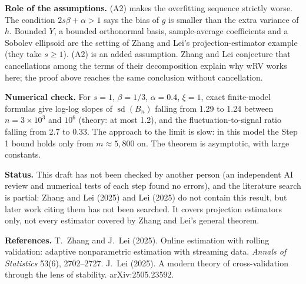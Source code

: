 \documentclass[11pt]{article}
\newcommand{\sd}{\operatorname{sd}}
\begin{document}
\textbf{Role of the assumptions.} (A2) makes the overfitting sequence strictly worse. The condition $2s\beta+\alpha>1$ says the bias of $g$ is smaller than the extra variance of $h$. Bounded $Y$, a bounded orthonormal basis, sample-average coefficients and a Sobolev ellipsoid are the setting of Zhang and Lei's projection-estimator example (they take $s\ge1$). (A2) is an added assumption. Zhang and Lei conjecture that cancellations among the terms of their decomposition explain why wRV works here; the proof above reaches the same conclusion without cancellation.

\textbf{Numerical check.} For $s=1$, $\beta=1/3$, $\alpha=0.4$, $\xi=1$, exact finite-model formulas give log-log slopes of $\sd(B_n)$ falling from 1.29 to 1.24 between $n=3\times10^3$ and $10^6$ (theory: at most 1.2), and the fluctuation-to-signal ratio falling from 2.7 to 0.33. The approach to the limit is slow: in this model the Step 1 bound holds only from $m\approx5{,}800$ on. The theorem is asymptotic, with large constants.

\textbf{Status.} This draft has not been checked by another person (an independent AI review and numerical tests of each step found no errors), and the literature search is partial: Zhang and Lei (2025) and Lei (2025) do not contain this result, but later work citing them has not been searched. It covers projection estimators only, not every estimator covered by Zhang and Lei's general theorem.

\medskip\noindent\textbf{References.}
T.~Zhang and J.~Lei (2025). Online estimation with rolling validation: adaptive nonparametric estimation with streaming data. \emph{Annals of Statistics} 53(6), 2702--2727.
J.~Lei (2025). A modern theory of cross-validation through the lens of stability. arXiv:2505.23592.
\end{document}
